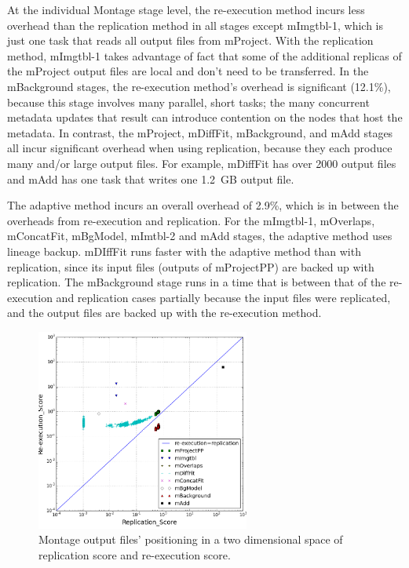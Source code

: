 \documentclass{sig-alternate}
\newcommand{\zhaonote}[1]{{\textcolor{cyan}    { ***Zhao:      #1 }}}
\newcommand{\kylenote}[1]{{\textcolor{orange}    { ***Kyle:      #1 }}}
\newcommand{\zhaonote}[1]{}
\newcommand{\kylenote}[1]{}
\begin{document}
At the individual Montage stage level, the re-execution method incurs less overhead than the replication method in all stages except mImgtbl-1,
which is just one task that reads all output files from mProject.
With the replication method, mImgtbl-1 takes advantage of fact that some of the additional replicas of the mProject output files are local and don't need to be transferred.
In the mBackground stages, the re-execution method's overhead is significant (12.1\%), because this stage involves many
parallel, short tasks; the many concurrent metadata updates that result can introduce contention on the nodes that host the metadata.
In contrast, the mProject, mDiffFit, mBackground, and mAdd stages all incur significant overhead when using replication, because they each produce many and/or large output files.
For example, mDiffFit has over 2000 output files and mAdd has one task that writes one 1.2~GB output file.

The adaptive method incurs an overall overhead of 2.9\%, which is in between the overheads from re-execution and replication.
For the mImgtbl-1, mOverlaps, mConcatFit, mBgModel, mImtbl-2 and mAdd stages, the adaptive
method uses lineage backup.
mDIffFit runs faster with the adaptive method than with replication, since its input files (outputs of mProjectPP) are backed up with replication.
The mBackground stage runs in a time that is between that of the re-execution and replication cases partially because the input files
were replicated, and the output files are backed up with the re-execution method.


\begin{figure}[ht]
        \begin{center}
                \includegraphics[width=70mm]{pictures/dist}
                \vspace{-10pt}
                \caption{Montage output files' positioning in a two dimensional space of replication score and re-execution score.
                \label{fig:montage-space}}
        \end{center}
\end{figure}
\end{document}
